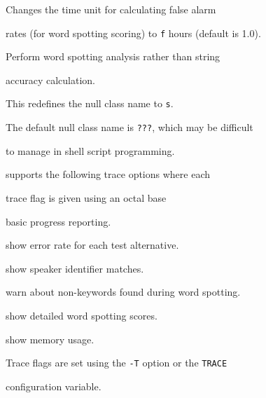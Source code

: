 \begin{optlist}
   Changes the time unit for calculating false alarm


      rates (for word spotting scoring) to \texttt{f} hours (default is 1.0).





   Perform word spotting analysis rather than string


      accuracy calculation.  





   This redefines the null class name to {\tt s}. 


  The default null class name is {\tt ???}, which may be difficult 


  to manage in shell script programming.





\stdoptG


\stdoptI


\stdoptL


\stdoptX





\end{optlist}












 supports the following trace options where each


trace flag is given using an octal base


\begin{optlist}


    basic progress reporting.


    show error rate for each test alternative.


    show speaker identifier matches.


    warn about non-keywords found during word spotting.


    show detailed word spotting scores.


    show memory usage.


\end{optlist}


Trace flags are set using the \texttt{-T} option or the  \texttt{TRACE} 


configuration variable.


















